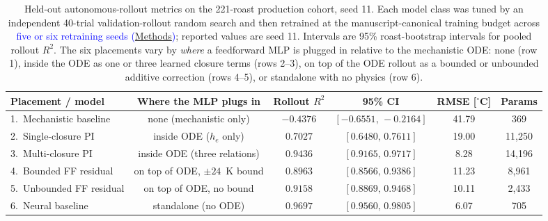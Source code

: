 \documentclass[fleqn,10pt]{wlscirep}
\newcommand{\rev}[1]{\textcolor{blue}{#1}}
\newcommand{\Methods}{\hyperref[sec:methods]{Methods}}
\begin{document}
\begin{table}[!htbp]
\centering
\small
\begin{tabular}{|l|c|c|c|c|c|}
\hline
Placement / model & Where the MLP plugs in & Rollout $R^2$ & 95\% CI & RMSE [$^\circ$C] & Params \\
\hline
1.~Mechanistic baseline & none (mechanistic only) & $-0.4376$ & $[-0.6551,\,-0.2164]$ & 41.79 & 369 \\
2.~Single-closure PI & inside ODE ($h_e$ only) & $0.7027$ & $[0.6480,\,0.7611]$ & 19.00 & 11{,}250 \\
3.~Multi-closure PI & inside ODE (three relations) & $0.9436$ & $[0.9165,\,0.9717]$ & 8.28 & 14{,}196 \\
4.~Bounded FF residual & on top of ODE, $\pm 24$~K bound & $0.8963$ & $[0.8566,\,0.9386]$ & 11.23 & 8{,}961 \\
5.~Unbounded FF residual & on top of ODE, no bound & $0.9158$ & $[0.8869,\,0.9468]$ & 10.11 & 2{,}433 \\
6.~Neural baseline & standalone (no ODE) & $0.9697$ & $[0.9560,\,0.9805]$ & 6.07 & 705 \\
\hline
\end{tabular}
\caption{Held-out autonomous-rollout metrics on the 221-roast production cohort, seed 11. Each model class was tuned by an independent 40-trial validation-rollout random search and then retrained at the manuscript-canonical training budget across \rev{five or six retraining seeds (\Methods)}; reported values are seed 11. Intervals are 95\% roast-bootstrap intervals for pooled rollout $R^2$. The six placements vary by \emph{where} a feedforward MLP is plugged in relative to the mechanistic ODE: none (row 1), inside the ODE as one or three learned closure terms (rows 2--3), on top of the ODE rollout as a bounded or unbounded additive correction (rows 4--5), or standalone with no physics (row 6).}
\label{tab:rollout_summary}
\end{table}
\end{document}

